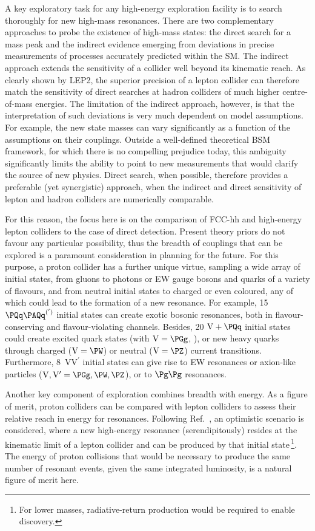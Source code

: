 A key exploratory task for any high-energy exploration facility is to search thoroughly for new high-mass resonances. 
There are two complementary approaches to probe the existence of high-mass states: 
the direct search for a mass peak 
and the indirect evidence emerging from deviations in precise measurements of processes accurately predicted within the SM. 
The indirect approach extends the sensitivity of a collider well beyond its kinematic reach. 
As clearly shown by LEP2, 
the superior precision of a lepton collider can therefore 
match the sensitivity of direct searches at hadron colliders of much higher centre-of-mass energies. 
The limitation of the indirect approach, however, 
is that the interpretation of such deviations is very much dependent on model assumptions. 
For example, the new state masses can vary significantly as a function of the assumptions on their couplings. 
Outside a well-defined theoretical BSM framework, for which there is no compelling prejudice today, 
this ambiguity significantly limits the ability to point to new measurements that would clarify the source of new physics. 
Direct search, when possible, therefore provides a preferable (yet synergistic) approach, 
when the indirect and direct sensitivity of lepton and hadron colliders are numerically comparable. 

For this reason, the focus here is on the comparison of FCC-hh and high-energy lepton colliders to the case of direct detection. 
Present theory priors do not favour any particular possibility, 
thus the breadth of couplings that can be explored is a paramount consideration in planning for the future.
For this purpose, a proton collider has a further unique virtue, sampling a wide array of initial states, 
from gluons to photons or EW gauge bosons and quarks of a variety of flavours, 
and from neutral initial states to charged or even coloured, 
any of which could lead to the formation of a new resonance.
For example, 15 $\qqbar^{(')}$ initial states can create exotic bosonic resonances, 
both in flavour-conserving and flavour-violating channels. 
Besides, 20 $\mathrm{V}+\PQq$ initial states could create excited quark states (with $\mathrm{V} = \PGg$, \Pg), 
or new heavy quarks through charged ($\mathrm{V} = \PW$) or neutral ($\mathrm{V} = \PZ$) current transitions. 
Furthermore,
8~$\mathrm{V}\mathrm{V}^\prime$ initial states can give rise to EW resonances 
or axion-like particles ($\mathrm{V},\mathrm{V}^\prime = \PGg, \PW, \PZ$), or to $\Pg\Pg$ resonances.

Another key component of exploration combines breadth with energy.  
As a figure of merit, proton colliders can be compared with lepton colliders to assess their relative reach in energy for resonances.  
Following Ref.~\cite{AlAli:2021let}, an optimistic scenario is considered, 
where a new high-energy resonance (serendipitously) resides at the kinematic limit of a lepton collider 
and can be produced by that initial 
state\,\footnote{For lower masses, radiative-return production would be required to enable discovery.}. 
The energy of proton collisions that would be necessary to produce the same number of resonant events, 
given the same integrated luminosity, is a natural figure of merit here. 

